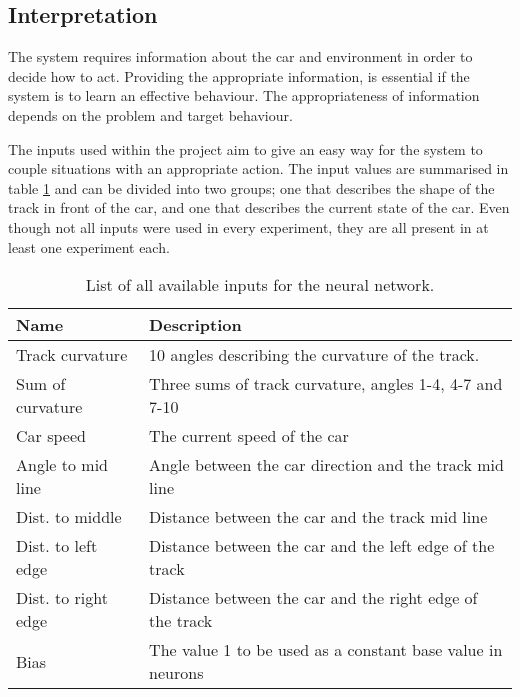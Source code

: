 \subsection{Interpretation}
\label{method:interpretation}

The system requires information about the car and environment in order to decide how to act. Providing the appropriate information, is essential if the system is to learn an effective behaviour. The appropriateness of information depends on the problem and target behaviour. 

The inputs used within the project aim to give an easy way for the system to couple situations with an appropriate action. The input values are summarised in table \ref{tab:input_table} and can be divided into two groups; one that describes the shape of the track in front of the car, and one that describes the current state of the car. Even though not all inputs were used in every experiment, they are all present in at least one experiment each.

\begin{table}[h!] 
  \centering
  \begin{tabular}{ll}
    \toprule
    Name & Description\\
    \midrule
    Track curvature & 10 angles describing the curvature of the track. \\
    Sum of curvature & Three sums of track curvature, angles 1-4, 4-7 and 7-10\\
    \midrule
    Car speed & The current speed of the car\\
    Angle to mid line & Angle between the car direction and the track mid line\\
    Dist. to middle & Distance between the car and the track mid line\\
    Dist. to left edge & Distance between the car and the left edge of the track\\
    Dist. to right edge & Distance between the car and the right edge of the track\\
    \midrule
    Bias & The value 1 to be used as a constant base value in neurons\\
    \bottomrule
  \end{tabular}
  \caption{List of all available inputs for the neural network.}
  \label{tab:input_table}
\end{table}

